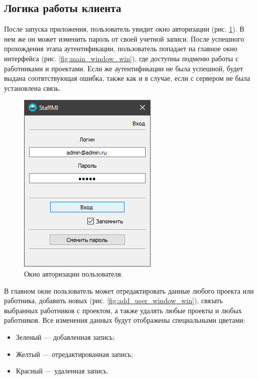\subsection{Логика работы клиента}
После запуска приложения, пользователь увидит окно авторизации (рис. \ref{fig:auth_window_win}).
В нем же он может изменить пароль от своей учетной записи. После успешного прохождения этапа аутентификации,
пользователь попадает на главное окно интерфейса (рис. \ref{fig:main_window_win}), где доступны подменю работы с работниками и проектами.
Если же аутентификации не была успешной, будет выдана соотвтствующая ошибка, также как и в случае, если с сервером не была установлена связь.
\begin{figure}[h]
    \centering
    \includegraphics[width=0.4\linewidth]{img/auth_window_win.png}
    \caption{Окно авторизации пользователя.}
    \label{fig:auth_window_win}
\end{figure}

В главном окне пользователь может отредактировать данные любого проекта или работника,
добавить новых (рис. \ref{fig:add_user_window_win}), связать выбранных работников с проектом,
а также удалять любые проекты и любых работников. Все изменения данных будут отображены специальными цветами:
\begin{itemize}
    \item Зеленый --- добавленная запись;
    \item Желтый --- отредактированная запись;
    \item Красный --- удаленная запись.
\end{itemize}


